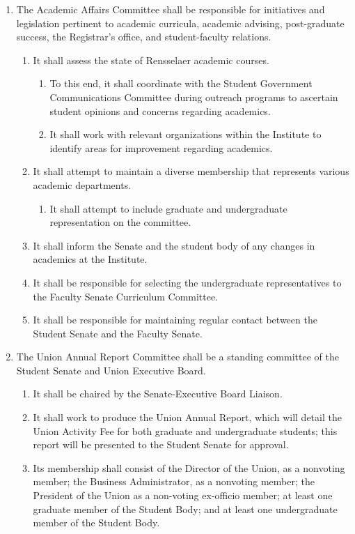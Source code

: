 \documentclass{bylaws}
\begin{document}
\begin{enumerate}
\item The Academic Affairs Committee shall be responsible for initiatives and legislation pertinent to academic curricula, academic
advising, post-graduate success, the Registrar’s office, and student-faculty relations.
\begin{enumerate}
\item It shall assess the state of Rensselaer academic courses.
\begin{enumerate}
\item To this end, it shall coordinate with the Student Government Communications Committee during outreach programs
to ascertain student opinions and concerns regarding academics.
\item It shall work with relevant organizations within the Institute to identify areas for improvement regarding academics.
\end{enumerate}
\item It shall attempt to maintain a diverse membership that represents various academic departments.
\begin{enumerate}
\item It shall attempt to include graduate and undergraduate representation on the committee.
\end{enumerate}
\item It shall inform the Senate and the student body of any changes in academics at the Institute.
\item It shall be responsible for selecting the undergraduate representatives to the Faculty Senate Curriculum Committee.
\item It shall be responsible for maintaining regular contact between the Student Senate and the Faculty Senate.
\end{enumerate}

\item The Union Annual Report Committee shall be a standing committee of the Student Senate and Union Executive Board.
\begin{enumerate}
\item It shall be chaired by the Senate-Executive Board Liaison.
\item It shall work to produce the Union Annual Report, which will detail the Union Activity Fee for both graduate and
undergraduate students; this report will be presented to the Student Senate for approval.
\item Its membership shall consist of the Director of the Union, as a nonvoting member; the Business Administrator, as a
nonvoting member; the President of the Union as a non-voting ex-officio member; at least one graduate member of the
Student Body; and at least one undergraduate member of the Student Body.
\end{enumerate}


\end{enumerate}
\end{document}
